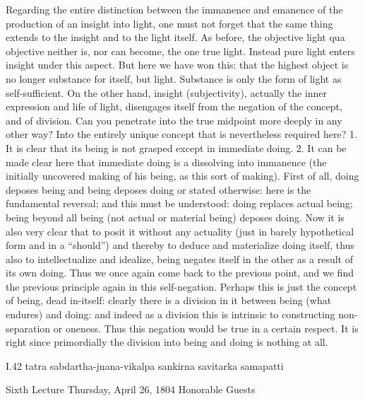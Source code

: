 Regarding the entire distinction
between the immanence and emanence
of the production of an insight into light,
one must not forget that the same thing
extends to the insight and to the light itself.
As before, the objective light qua objective
neither is, nor can become, the one true light.
Instead pure light enters insight under this aspect.
But here we have won this:
that the highest object is no longer
substance for itself, but light.
Substance is only the form of light as self-sufficient.
On the other hand, insight (subjectivity),
actually the inner expression and life of light,
disengages itself from the negation of
the concept, and of division.
Can you penetrate into the true midpoint
more deeply in any other way?
Into the entirely unique concept
that is nevertheless required here?
1. It is clear that its being is not grasped
except in immediate doing.
2. It can be made clear here that immediate doing is
a dissolving into immanence
(the initially uncovered making of his being,
as this sort of making).
First of all, doing deposes being
and being deposes doing
or stated otherwise:
here is the fundamental reversal;
and this must be understood:
doing replaces actual being;
being beyond all being
(not actual or material being)
deposes doing.
Now it is also very clear that
to posit it without any actuality
(just in barely hypothetical form and in a “should”)
and thereby to deduce and materialize doing itself,
thus also to intellectualize and idealize,
being negates itself in the other
as a result of its own doing.
Thus we once again come back to the previous point,
and we find the previous principle again in this self-negation.
Perhaps this is just the concept of being, dead in-itself:
clearly there is a division in it
between being (what endures) and doing:
and indeed as a division this is intrinsic
to constructing non-separation or oneness.
Thus this negation would be true in a certain respect.
It is right since primordially the division
into being and doing is nothing at all.

I.42
tatra sabdartha-jnana-vikalpa sankirna savitarka samapatti

Sixth Lecture
Thursday, April 26, 1804
Honorable Guests

